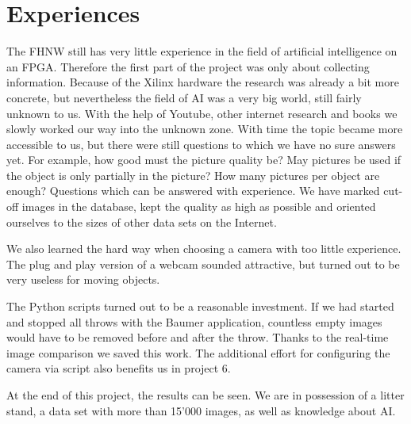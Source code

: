 \section{Experiences}
\label{sec:experiences}

The FHNW still has very little experience in the field of artificial intelligence on an FPGA.
Therefore the first part of the project was only about collecting information.
Because of the Xilinx hardware the research was already a bit more concrete, but nevertheless the field of AI was a very big world, still fairly unknown to us.
With the help of Youtube, other internet research and books we slowly worked our way into the unknown zone. 
With time the topic became more accessible to us, but there were still questions to which we have no sure answers yet.
For example, how good must the picture quality be? 
May pictures be used if the object is only partially in the picture?
How many pictures per object are enough?
Questions which can be answered with experience.
We have marked cut-off images in the database, kept the quality as high as possible and oriented ourselves to the sizes of other data sets on the Internet.

We also learned the hard way when choosing a camera with too little experience.
The plug and play version of a webcam sounded attractive, but turned out to be very useless for moving objects.

The Python scripts turned out to be a reasonable investment.
If we had started and stopped all throws with the Baumer application, countless empty images would have to be removed before and after the throw.
Thanks to the real-time image comparison we saved this work.
The additional effort for configuring the camera via script also benefits us in project 6.

At the end of this project, the results can be seen.
We are in possession of a litter stand, a data set with more than 15'000 images, as well as knowledge about AI.
